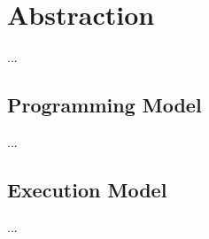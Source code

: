 


\section{Abstraction}
\label{sec:tiling:lc}
...

\subsection{Programming Model}
...

\subsection{Execution Model}
...

